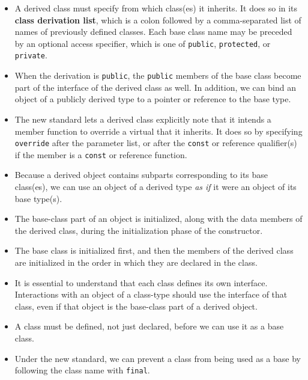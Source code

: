 \begin{itemize}
\item
A derived class must specify from which class(es) it inherits. It does so in its \textbf{class derivation list}, which is a colon followed by a comma-separated list of names of previously defined classes. Each base class name may be preceded by an optional access specifier, which is one of \texttt{public}, \texttt{protected}, or \texttt{private}.

\item
When the derivation is \texttt{public}, the \texttt{public} members of the base class become part of the interface of the derived class as well. In addition, we can bind an object of a publicly derived type to a pointer or reference to the base type.

\item
The new standard lets a derived class explicitly note that it intends a member function to override a virtual that it inherits. It does so by specifying \texttt{override} after the parameter list, or after the \texttt{const} or reference qualifier(s) if the member is a \texttt{const} or reference function.

\item
Because a derived object contains subparts corresponding to its base class(es), we can use an object of a derived type \textit{as if} it were an object of its base type(s).

\item
The base-class part of an object is initialized, along with the data members of the derived class, during the initialization phase of the constructor.

\item
The base class is initialized first, and then the members of the derived class are initialized in the order in which they are declared in the class.

\item
It is essential to understand that each class defines its own interface. Interactions with an object of a class-type should use the interface of that class, even if that object is the base-class part of a derived object.

\item
A class must be defined, not just declared, before we can use it as a base class.

\item
Under the new standard, we can prevent a class from being used as a base by following the class name with \texttt{final}.

\end{itemize}